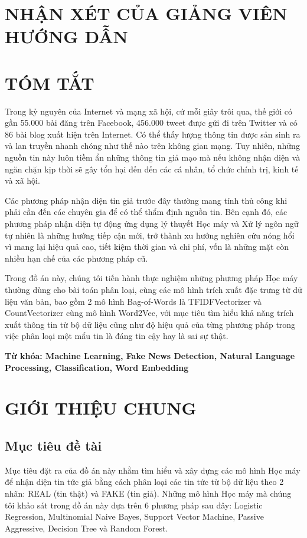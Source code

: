 \documentclass[12pt,a4paper,oneside]{book}
\begin{document}
\chapter*{NHẬN XÉT CỦA GIẢNG VIÊN HƯỚNG DẪN}
	
\chapter*{TÓM TẮT}

	Trong kỷ nguyên của Internet và mạng xã hội, cứ mỗi giây trôi qua, thế giới có gần 55.000 bài đăng trên Facebook, 456.000 tweet được gửi đi trên Twitter và có 86 bài blog xuất hiện trên Internet. Có thể thấy lượng thông tin được sản sinh ra và lan truyền nhanh chóng như thế nào trên không gian mạng. Tuy nhiên, những nguồn tin này luôn tiềm ẩn những thông tin giả mạo mà nếu không nhận diện và ngăn chặn kịp thời sẽ gây tổn hại đến đến các cá nhân, tổ chức chính trị, kinh tế và xã hội. 


	Các phương pháp nhận diện tin giả trước đây thường mang tính thủ công khi phải cần đến các chuyên gia để có thể thẩm định nguồn tin. Bên cạnh đó, các phương pháp nhận diện tự động ứng dụng lý thuyết Học máy và Xử lý ngôn ngữ tự nhiên là những hướng tiếp cận mới, trở thành xu hướng nghiên cứu nóng hổi vì mang lại hiệu quả cao, tiết kiệm thời gian và chi phí, vốn là những mặt còn nhiều hạn chế của các phương pháp cũ.


	Trong đồ án này, chúng tôi tiến hành thực nghiệm những phương pháp Học máy thường dùng cho bài toán phân loại, cùng các mô hình trích xuất đặc trưng từ dữ liệu văn bản, bao gồm 2 mô hình Bag-of-Words là TFIDFVectorizer và CountVectorizer cùng mô hình Word2Vec, với mục tiêu tìm hiểu khả năng trích xuất thông tin từ bộ dữ liệu cũng như độ hiệu quả của từng phương pháp trong việc phân loại một mẩu tin là đáng tin cậy hay là sai sự thật.

	\vspace{0.5cm}
	\textbf{Từ khóa: Machine Learning, Fake News Detection, Natural Language Processing, Classification, Word Embedding}
	\pagebreak
	
\chapter{GIỚI THIỆU CHUNG}

	\section{Mục tiêu đề tài}
	Mục tiêu đặt ra của đồ án này nhằm tìm hiểu và xây dựng các mô hình Học máy để nhận diện tin tức giả bằng cách phân loại các tin tức từ bộ dữ liệu theo 2 nhãn: REAL (tin thật) và FAKE (tin giả). Những mô hình Học máy mà chúng tôi khảo sát trong đồ án này dựa trên 6 phương pháp sau đây: Logistic Regression, Multinomial Naive Bayes, Support Vector Machine, Passive Aggressive, Decision Tree và Random Forest.
	
\end{document}
